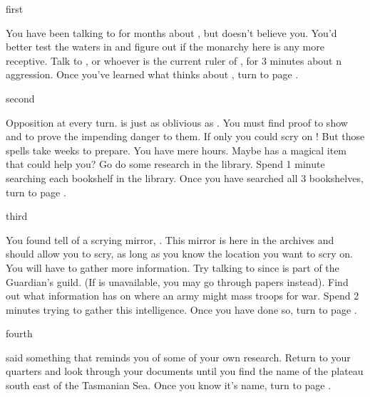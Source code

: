 \documentclass[greennotebook]{NeptuneBall}
\begin{document}

\startnotebook{\nIndianAggression{}}

\begin{page}{first}

You have been talking to \cPrince{} for months about \pIndia{}, but \cPrince{\they} doesn't believe you. You'd better test the waters in \pAtlantis{} and figure out if the monarchy here is any more receptive. Talk to \cKing{}, or whoever is the current ruler of \pAtlantis{}, for 3 minutes about \pIndia{}n aggression. Once you've learned what \pAtlantis{} thinks about \pIndia{}, turn to page .

\end{page}

\begin{page}{second}

Opposition at every turn. \pAtlantis{} is just as oblivious as \pPacifica{}. You must find proof to show \cPrince{} and \cKing{} to prove the impending danger to them. If only you could scry on \pIndia{}! But those spells take weeks to prepare. You have mere hours. Maybe \pAtlantis{} has a magical item that could help you? Go do some research in the library. Spend 1 minute searching each bookshelf in the library. Once you have searched all 3 bookshelves, turn to page .

\end{page}

\begin{page}{third}

You found tell of a scrying mirror, \iScryingMirror{}. This mirror is here in the archives and should allow you to scry, as long as you know the location you want to scry on. You will have to gather more information. Try talking to \cGeneral{} since \cGeneral{\they} is part of the Guardian's guild. (If \cGeneral{} is unavailable, you may go through \cGeneral{\their} papers instead). Find out what information \cGeneral{} has on where an army might mass troops for war. Spend 2 minutes trying to gather this intelligence. Once you have done so, turn to page .

\end{page}

\begin{page}{fourth} %

\cGeneral{} said something that reminds you of some of your own research. Return to your quarters and look through your documents until you find the name of the plateau south east of the Tasmanian Sea. Once you know it's name, turn to page .

\end{page}
\end{document}
